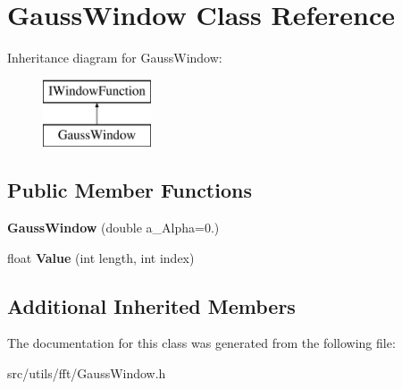 \hypertarget{class_gauss_window}{}\section{Gauss\+Window Class Reference}
\label{class_gauss_window}
Inheritance diagram for Gauss\+Window\+:\begin{figure}[H]
\begin{center}
\leavevmode
\includegraphics[height=2.000000cm]{class_gauss_window}
\end{center}
\end{figure}
\subsection*{Public Member Functions}
\begin{DoxyCompactItemize}
\item 
\mbox{\label{class_gauss_window_a9ac9808a2f043efff93bcd286b6afd61}} 
{\bfseries Gauss\+Window} (double a\+\_\+\+Alpha=0.)
\item 
\mbox{\label{class_gauss_window_acbb50438a57dcc11f351bbd205720ca6}} 
float {\bfseries Value} (int length, int index)
\end{DoxyCompactItemize}
\subsection*{Additional Inherited Members}


The documentation for this class was generated from the following file\+:\begin{DoxyCompactItemize}
\item 
src/utils/fft/Gauss\+Window.\+h\end{DoxyCompactItemize}
